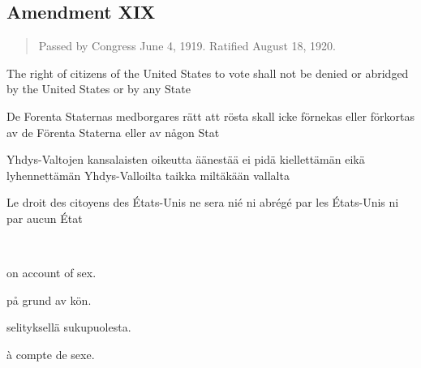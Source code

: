 \documentclass[a4,landscape,12pt]{article}
\begin{document}
\subsection*{Amendment XIX}
\begin{quote}\small
Passed by Congress June 4, 1919. Ratified August 18, 1920.
\end{quote}
\begin{minipage}[t]{0.22\textwidth}
	The right of citizens of the United States to vote shall not be denied or abridged by the United States or by any State
\end{minipage}\textwidth
\begin{minipage}[t]{0.22\textwidth}
	De Forenta Staternas medborgares rätt att rösta skall icke förnekas eller förkortas av de Förenta Staterna eller av någon Stat
\end{minipage}\textwidth
\begin{minipage}[t]{0.22\textwidth}
	Yhdys-Valtojen kansalaisten oikeutta äänestää ei pidä kiellettämän eikä lyhennettämän Yhdys-Valloilta taikka miltäkään vallalta
\end{minipage}\textwidth
\begin{minipage}[t]{0.22\textwidth}
	Le droit des citoyens des États-Unis ne sera nié ni abrégé par les États-Unis ni par aucun État
\end{minipage}

~

\begin{minipage}[t]{0.22\textwidth}
on account of sex.
\end{minipage}\textwidth
\begin{minipage}[t]{0.22\textwidth}
på grund av kön.
\end{minipage}\textwidth
\begin{minipage}[t]{0.22\textwidth}
selityksellä sukupuolesta.
\end{minipage}\textwidth
\begin{minipage}[t]{0.22\textwidth}
	à compte de sexe.
\end{minipage}

~
\end{document}
